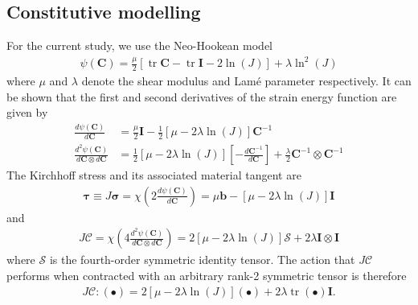 \documentclass[preprint,12pt,times]{elsarticle}
\DeclareMathOperator{\trace}{tr}
\begin{document}
\subsection{Constitutive modelling}

For the current study, we use the Neo-Hookean model
\begin{gather}
\psi \left( \mathbf{C} \right)
  = \frac{\mu}{2} \left[ \trace{\mathbf{C}} - \trace{\mathbf{I}} - 2 \ln\left( J \right) \right]
  + \lambda \ln^{2}\left( J \right)
\end{gather}
where $\mu$ and $\lambda$ denote the shear modulus and Lam\'{e} parameter respectively. It can be shown that the first and second derivatives of the strain energy function are given by
\begin{align}
\frac{d \psi \left( \mathbf{C} \right)}{d \mathbf{C}}
  &= \frac{\mu}{2} \mathbf{I} - \frac{1}{2} \left[ \mu - 2\lambda\ln\left( J \right) \right] \mathbf{C}^{-1} \\
\frac{d^{2} \psi \left( \mathbf{C} \right)}{d \mathbf{C} \otimes d \mathbf{C}}
  &= \frac{1}{2}\left[ \mu - 2\lambda\ln\left( J \right) \right] \left[ - \frac{d \mathbf{C}^{-1}}{d \mathbf{C}} \right]
  + \frac{\lambda}{2} \mathbf{C}^{-1} \otimes \mathbf{C}^{-1}
\end{align}
The Kirchhoff stress and its associated material tangent are
\begin{gather}
\boldsymbol{\tau}
  \equiv J \boldsymbol{\sigma}
  = \chi\left( 2 \frac{d \psi \left( \mathbf{C} \right)}{d \mathbf{C}} \right)
  = \mu \mathbf{b} - \left[ \mu - 2\lambda\ln\left( J \right) \right] \mathbf{I}
\end{gather}
and
\begin{gather}
J \boldsymbol{\mathcal{C}}
  = \chi\left( 4 \frac{d^{2} \psi \left( \mathbf{C} \right)}{d \mathbf{C} \otimes d \mathbf{C}} \right)
  = 2 \left[ \mu - 2\lambda\ln\left( J \right) \right] \boldsymbol{\mathcal{S}}
  + 2 \lambda \mathbf{I} \otimes \mathbf{I}
\end{gather}
where $\boldsymbol{\mathcal{S}}$ is the fourth-order symmetric identity tensor.
The action that $J \boldsymbol{\mathcal{C}}$ performs when contracted with an arbitrary rank-2 symmetric tensor is therefore
\begin{gather}
J \boldsymbol{\mathcal{C}} : \left( \bullet \right)
  = 2 \left[ \mu - 2\lambda\ln\left( J \right) \right] \left( \bullet \right)
  + 2 \lambda \trace\left( \bullet \right) \mathbf{I}.
\label{eq:simplified_action}
\end{gather}
\end{document}
